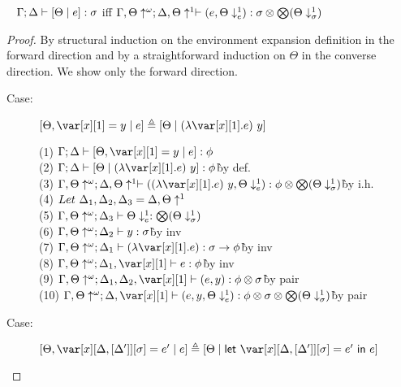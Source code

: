 \documentclass[acmsmall,review,screen]{acmart}
\newcommand{\llet}[2]{\mathsf{let}~#1~\mathsf{in}~#2}
\begin{document}
 \begin{lemma}~\label{lem:unwrapenv}
   $\Gamma ; \Delta \vdash [ \Theta \mid e] : \sigma$
     iff $\Gamma , \Theta\uparrow^{\omega} ; \Delta , \Theta\uparrow^1 \vdash  (e, \Theta\downarrow^1_e) : \sigma \otimes \bigotimes(\Theta\downarrow^1_\sigma)$
   \end{lemma}
\begin{proof}
By structural induction on the environment expansion definition in the
forward direction and by a straightforward induction on $\Theta$ in the
converse direction. We show only the forward direction.
\begin{description}
\item[Case:] $\left[\Theta, \xl = y \mid e\right] \triangleq \left[\Theta \mid (\lambda \xl. e)~y\right]$
\begin{tabbing}
    (1) $\G; \D \vdash \left[ \Theta, \xl = y \mid e \right] : \phi$\\
    (2) $\G; \D \vdash \left[ \Theta \mid (\lambda \xl. e)~y \right] : \phi$\` by def.\\
    (3) $\G, \Theta\uparrow^\omega; \D, \Theta\uparrow^1 \vdash ((\lambda \xl. e)~y, \Theta\downarrow^1_e) : \phi \otimes \bigotimes(\Theta\downarrow^1_\sigma)$\` by i.h.\\
    (4) $Let~\Delta_1,\Delta_2,\Delta_3 = \Delta, \Theta\uparrow^1 $\\
    (5) $\Gamma, \Theta\uparrow^\omega; \Delta_3 \vdash \Theta\downarrow^1_e : \bigotimes(\Theta\downarrow^1_\sigma)$\\
    (6) $\Gamma, \Theta\uparrow^\omega; \Delta_2 \vdash y : \sigma$\` by inv\\
    (7) $\G, \Theta\uparrow^\omega; \D_1 \vdash (\lambda \xl. e) : \s \to \phi $\` by inv\\
    (8) $\G, \Theta\uparrow^\omega; \D_1, \xl \vdash e : \phi $\` by inv\\
    (9) $\G, \Theta\uparrow^\omega; \D_1, \D_2, \xl \vdash (e, y) : \phi \otimes \sigma$\` by pair\\
    (10) $\G, \Theta\uparrow^\omega; \D, \xl \vdash (e, y, \Theta\downarrow^1_e) : \phi \otimes \sigma \otimes \bigotimes(\Theta\downarrow^1_\sigma)$\` by pair\\
\end{tabbing}
\item[Case:] $\left[\Theta, \xD = e' \mid e\right] \triangleq \left[\Theta \mid \llet{\xD = e'}{e}\right]$
\begin{tabbing}

\end{tabbing}
\end{description}
\end{proof}
\end{document}
